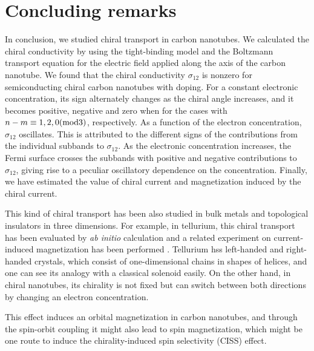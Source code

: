 \documentclass[journal=nalefd,manuscript=article,layout=twocolumn]{achemso}
\begin{document}
\section{Concluding remarks}
In conclusion, we studied chiral transport in carbon nanotubes. 
We calculated the chiral conductivity by using the tight-binding model 
and the Boltzmann transport equation for the electric field applied along the axis 
of the carbon nanotube. 
We found that the chiral conductivity $\sigma_{12}$ is nonzero for semiconducting chiral carbon nanotubes with doping. 
For a constant electronic concentration, its sign alternately changes 
as the chiral angle increases, and it becomes positive, negative and zero when for the cases with $n-m\equiv1,2,0 {\rm (mod 3)}$, respectively. 
As a function of the electron concentration, $\sigma_{12}$ oscillates.  
This is attributed to the different signs of the contributions from the individual subbands to $\sigma_{12}$. 
As the electronic concentration increases, the Fermi surface crosses the subbands with positive and negative contributions to $\sigma_{12}$, giving rise to a peculiar oscillatory dependence on the concentration. 
Finally, we have estimated the value of chiral current and magnetization induced by the chiral current.

This kind of chiral transport has been also studied in bulk metals and topological insulators in three dimensions. For example, in tellurium, this chiral transport has been evaluated by {\it ab initio} calculation \cite{Tsirkin2018} and  a related experiment on current-induced magnetization has been performed \cite{Furukawa2017}. Tellurium hss left-handed and right-handed crystals, which consist of one-dimensional chains in 
shapes of helices, and one can see its analogy with a classical 
solenoid easily. On the other hand, in chiral nanotubes, its chirality is not fixed but can switch between 
both directions by changing an electron concentration. 

This effect induces an orbital magnetization in carbon nanotubes, and through the spin-orbit
coupling it might also lead to spin magnetization, which might be one route to induce the  chirality-induced spin selectivity (CISS) effect\cite{Naaman2012, Gohler2011, Kettner2018, Bloom2016, Dor2014}.

\vspace{2mm}
\end{document}

